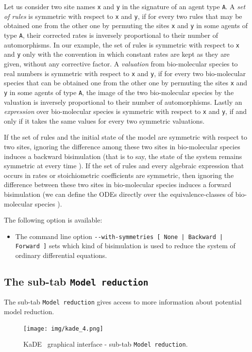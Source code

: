\documentclass[11pt]{book}
\def\KaDE{\textsf{KaDE}}
\def\ttt#1{\texttt{#1}}
\begin{document}
Let us consider two site names \ttt{x} and \ttt{y} in the signature of an agent type \ttt{A}.
A \emph{set of rules} is symmetric with respect to \ttt{x} and \ttt{y}, if for every two rules that may be obtained one from the other one by permuting the sites \ttt{x} and \ttt{y} in some agents of type \ttt{A}, their corrected rates is inversely proportional to their number of automorphisms.
In our example,  the set of rules is symmetric with respect to \ttt{x} and \ttt{y} only with the convention in which constant rates are kept as they are given, without any corrective factor. A \emph{valuation} from bio-molecular species to real numbers is symmetric with respect to \ttt{x} and \ttt{y}, if for every two bio-molecular species that can be obtained one from the other one by permuting the sites \ttt{x} and \ttt{y} in some agents of type \ttt{A}, the image of the two bio-molecular species by the valuation is inversely proportional to their number of automorphisms. Lastly an \emph{expression} over bio-molecular species is symmetric with respect to \ttt{x} and \ttt{y}, if and only if it takes the same values for every two symmetric valuations.

If the set of rules and the initial state of the model are symmetric with respect to two sites, ignoring the difference among these two sites in bio-molecular species induces a backward bisimulation (that is to say, the state of the system remains symmetric at every time \cite{buchholz_lump}). If the set of rules and every algebraic expression that occurs in rates or stoichiometric coefficients are symmetric, then ignoring the difference between these two sites in bio-molecular species induces a forward bisimulation (we can define the ODEs directly over the equivalence-classes of bio-molecular species \cite{buchholz_lump}).

The following option is available:
\begin{itemize}
  \item
The command line option \texttt{-{}-with-symmetries [ None | Backward | Forward ]} sets which kind of bisimulation is used to reduce the system of ordinary differential equations.
\end{itemize}

\subsection{The sub-tab \texttt{Model reduction}}

The sub-tab \texttt{Model reduction} gives access to more information about
potential model reduction.
\begin{figure}[htbp]
\centering
\texttt{[image: img/kade\_4.png]}
\caption{\KaDE~ graphical interface - sub-tab \texttt{Model reduction}.}
\label{fig:kade:4}
\end{figure}
\end{document}
